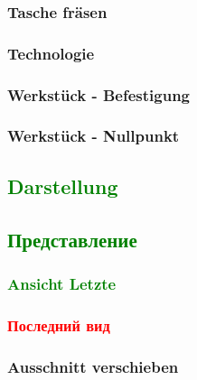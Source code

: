 \documentclass[14pt,a4paper]{book}
\newcommand{\DE}[1]{\textcolor{green}{#1}}
\newcommand{\RU}[1]{\textcolor{red}{#1}}
\begin{document}
			\subsubsection{Tasche fräsen} 
			\subsubsection{Technologie} 
			\subsubsection{Werkstück - Befestigung} 
			\subsubsection{Werkstück - Nullpunkt} 
		\DE{\subsection{Darstellung}}
		\DE{\subsection{Представление}}
			\DE{\subsubsection{Ansicht Letzte}} 
			\RU{\subsubsection{Последний вид}} 
			\subsubsection{Ausschnitt verschieben} 
\end{document}
